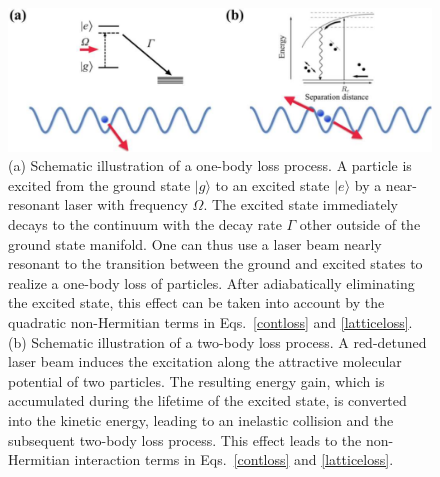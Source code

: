 \documentclass{tADP2e}
\theoremstyle{plain}
\theoremstyle{plain}
\theoremstyle{definition}
\begin{document}
\begin{figure}[t]
\begin{center}
\includegraphics[width=12cm]{./Figures/fig_4_loss.pdf}
\end{center}
\caption{(a) Schematic illustration of a one-body loss process. 
A particle is excited from the ground state $|g\rangle$ to an excited state $|e\rangle$ by a near-resonant laser with frequency $\Omega$. The excited state immediately decays to the continuum with the decay rate $\Gamma$ other outside of the ground state manifold. One can thus use a laser beam nearly resonant to the transition between the ground and excited states to realize a one-body loss of particles. After adiabatically eliminating the excited state, this effect can be taken into account by the quadratic non-Hermitian terms in Eqs.~\eqref{contloss} and \eqref{latticeloss}. (b) Schematic illustration of a two-body loss process. A red-detuned laser beam induces the excitation along the attractive molecular potential of two particles. The resulting energy gain, which is accumulated during the lifetime of the excited state, is converted into the kinetic energy, leading to an inelastic collision and the subsequent two-body loss process. This effect leads to the non-Hermitian interaction terms in Eqs.~\eqref{contloss} and \eqref{latticeloss}. }
\label{fig:4loss}
\end{figure}
\end{document}
